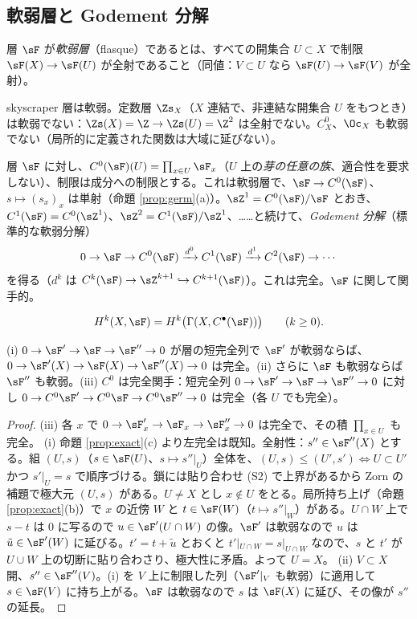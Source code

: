 \subsection{軟弱層と Godement 分解}
\begin{defn}[軟弱層]
層 $\sF$ が\emph{軟弱層}（flasque）であるとは、すべての開集合 $U\subset X$ で制限 $\sF(X)\to\sF(U)$ が全射であること（同値：$V\subset U$ なら $\sF(U)\to\sF(V)$ が全射）。
\end{defn}
\begin{ex}
skyscraper 層は軟弱。定数層 $\Zs_X$（$X$ 連結で、非連結な開集合 $U$ をもつとき）は軟弱でない：$\Zs(X)=\Z\to\Zs(U)=\Z^2$ は全射でない。$C^0_X$、$\Oc_X$ も軟弱でない（局所的に定義された関数は大域に延びない）。
\end{ex}
\begin{defn}
層 $\sF$ に対し、$C^0(\sF)(U)=\prod_{x\in U}\sF_x$（$U$ 上の\emph{芽の任意の族}、適合性を要求しない）、制限は成分への制限とする。これは軟弱層で、$\sF\to C^0(\sF)$、$s\mapsto(s_x)_x$ は単射（命題 \ref{prop:germ}(a)）。$\sZ^1=C^0(\sF)/\sF$ とおき、$C^1(\sF)=C^0(\sZ^1)$、$\sZ^2=C^1(\sF)/\sZ^1$、……と続けて、\emph{Godement 分解}（標準的な軟弱分解）
\[
0\to\sF\to C^0(\sF)\xrightarrow{d^0}C^1(\sF)\xrightarrow{d^1}C^2(\sF)\to\cdots
\]
を得る（$d^k$ は $C^k(\sF)\to\sZ^{k+1}\hookrightarrow C^{k+1}(\sF)$）。これは完全。$\sF$ に関して関手的。
\end{defn}
\begin{defn}[層コホモロジー]\label{def:sheafcohom}
\[
H^k(X,\sF)=H^k\big(\Gamma(X,C^\bullet(\sF))\big)\qquad(k\ge0).
\]
\end{defn}
\begin{lem}\label{lem:flasque}\tP
(i) $0\to\sF'\to\sF\to\sF''\to0$ が層の短完全列で $\sF'$ が軟弱ならば、$0\to\sF'(X)\to\sF(X)\to\sF''(X)\to0$ は完全。(ii) さらに $\sF$ も軟弱ならば $\sF''$ も軟弱。(iii) $C^0$ は完全関手：短完全列 $0\to\sF'\to\sF\to\sF''\to0$ に対し $0\to C^0\sF'\to C^0\sF\to C^0\sF''\to0$ は完全（各 $U$ でも完全）。
\end{lem}
\begin{proof}
(iii) 各 $x$ で $0\to\sF'_x\to\sF_x\to\sF''_x\to0$ は完全で、その積 $\prod_{x\in U}$ も完全。
(i) 命題 \ref{prop:exact}(c) より左完全は既知。全射性：$s''\in\sF''(X)$ とする。組 $(U,s)$（$s\in\sF(U)$、$s\mapsto s''|_U$）全体を、$(U,s)\le(U',s')\iff U\subset U'$ かつ $s'|_U=s$ で順序づける。鎖には貼り合わせ (S2) で上界があるから Zorn の補題で極大元 $(U,s)$ がある。$U\ne X$ とし $x\notin U$ をとる。局所持ち上げ（命題 \ref{prop:exact}(b)）で $x$ の近傍 $W$ と $t\in\sF(W)$（$t\mapsto s''|_W$）がある。$U\cap W$ 上で $s-t$ は $0$ に写るので $u\in\sF'(U\cap W)$ の像。$\sF'$ は軟弱なので $u$ は $\tilde u\in\sF'(W)$ に延びる。$t'=t+\tilde u$ とおくと $t'|_{U\cap W}=s|_{U\cap W}$ なので、$s$ と $t'$ が $U\cup W$ 上の切断に貼り合わさり、極大性に矛盾。よって $U=X$。
(ii) $V\subset X$ 開、$s''\in\sF''(V)$。(i) を $V$ 上に制限した列（$\sF'|_V$ も軟弱）に適用して $s\in\sF(V)$ に持ち上がる。$\sF$ は軟弱なので $s$ は $\sF(X)$ に延び、その像が $s''$ の延長。\qedhere
\end{proof}
